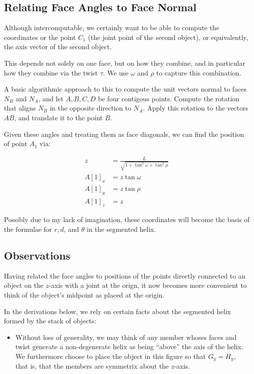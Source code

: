 \documentclass[11pt]{article}
\begin{document}
{\subsection{Relating Face Angles to Face Normal}

Although intercomputable, we certainly want to be able to compute
the coordinates or the point $C_1$ (the joint point of the second object),
or equivalently, the axis vector of the second object.

This depends not solely on one face, but on how they combine, and in
particular how they combine via the twist $\tau$. We use $\omega$ and $\rho$
to capture this combination.

A basic algorithmic approach to this to compute the unit vectors
normal to faces $N_B$ and $N_A$, and let $A,B,C,D$ be four contigous
points.
Compute the rotation that aligns $N_B$ in the opposite direction to $N_A$.
Apply this rotation to the vectors $AB$, and translate it to the
point $B$.

Given these angles and treating them as face diagonals,
we can find the position of point $A_1$ via:

\begin{align}
  z &= \frac{L}{\sqrt{1 + \tan^2{\omega} + \tan^2{\rho}}}  \\
  A[1]_x &= z \tan{\omega} \\
  A[1]_y &= z \tan{\rho} \\
  A[1]_z &= z
\end{align}

Possibly due to my lack of imagination, these coordinates
will become the basis of the formulae for $r,d$, and $\theta$
in the segmented helix.



\subsection{Observations}

Having related the face angles to positions of the points directly connected
to an object on the $z$-axis with a joint at the orign, it now becomes more
convenient to think of the object's midpoint as placed at the origin.

In the derivations below, we rely on certain facts about
the segmented helix formed by the stack of objects:
\begin{itemize}
\item Without loss of generality, we may think of any member whoses faces
  and twist generate a non-degenerate helix as being ``above'' the
  axis of the helix. We furthermore choose to place the object in
  this figure so that $G_y = H_y$, that is, that the members are symmetrix
  about the $z$-axis. 
  

\end{itemize}}
\end{document}
